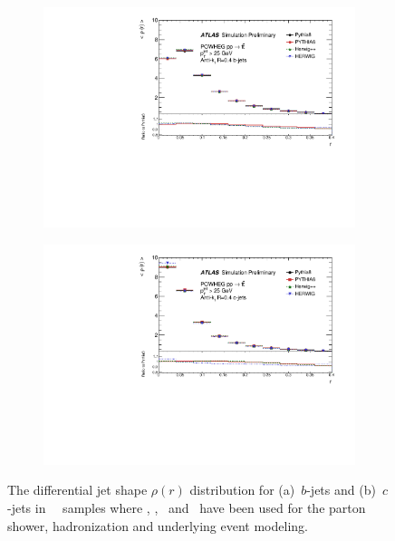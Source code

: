 \begin{figure}
\centering
\begin{subfigure}[]{0.45\textwidth}
\includegraphics[width=\textwidth]{evtgen/figures/Frag/Top/SingleB/Rho.pdf}
\end{subfigure}
\begin{subfigure}[]{0.45\textwidth}
\includegraphics[width=\textwidth]{evtgen/figures/Frag/Top/SingleC/Rho.pdf}
\end{subfigure}
\caption{The differential jet shape $\rho(r)$ distribution for 
(a)~$b$-jets and (b)~$c$-jets in \PowHeg\
\ttbar\ samples where  \PythiaE, \Pythia, \Herwigpp\ and \Herwig\ have been used 
for the parton shower, hadronization and underlying event modeling. }
\label{fig:trho}
\end{figure}


